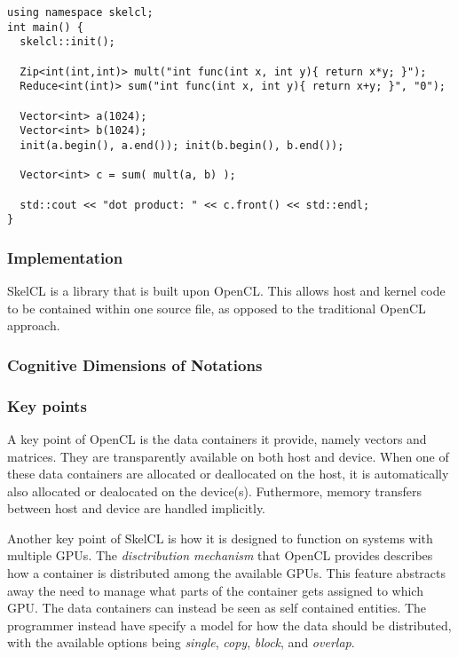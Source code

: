 \begin{lstlisting}[caption={Computation of the dot product of two vectors}, label=code:skelclSample] 
using namespace skelcl;
int main() {
  skelcl::init();

  Zip<int(int,int)> mult("int func(int x, int y){ return x*y; }");
  Reduce<int(int)> sum("int func(int x, int y){ return x+y; }", "0");

  Vector<int> a(1024);
  Vector<int> b(1024);
  init(a.begin(), a.end()); init(b.begin(), b.end());

  Vector<int> c = sum( mult(a, b) );

  std::cout << "dot product: " << c.front() << std::endl;
}
\end{lstlisting}

\subsubsection{Implementation}
SkelCL is a library that is built upon OpenCL. This allows host and kernel code to be contained within one source file, as opposed to the traditional OpenCL approach.

\subsubsection{Cognitive Dimensions of Notations}

\subsubsection{Key points}
A key point of OpenCL is the data containers it provide, namely vectors and matrices. They are transparently available on both host and device. When one of these data containers are allocated or deallocated on the host, it is automatically also allocated or dealocated on the device(s). Futhermore, memory transfers between host and device are handled implicitly.

Another key point of SkelCL is how it is designed to function on systems with multiple GPUs. The \textit{disctribution mechanism} that OpenCL provides describes how a container is distributed among the available GPUs. This feature abstracts away the need to manage what parts of the container gets assigned to which GPU. The data containers can instead be seen as self contained entities. The programmer instead have specify a model for how the data should be distributed, with the available options being \textit{single}, \textit{copy}, \textit{block}, and \textit{overlap}.

